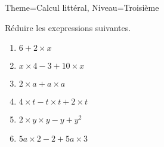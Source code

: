 \documentclass[11pt]{article}
\begin{document}
\begin{multicols}{2}
\begin{Maquette}[Fiche]{Theme=Calcul littéral, Niveau=Troisième}
\columnbreak

\begin{exercice}
    Réduire les exepressions suivantes.
    \begin{enumerate}[label=\textbf{\alph*.}]
        \item $6 + 2 \times x$
        \item $x \times 4 -3 + 10 \times x $
        \item $ 2 \times a + a \times a$
        \item $4 \times t - t \times t + 2 \times t$
        \item $2 \times y \times y - y + y^2$
        \item $5a \times 2 - 2 + 5a \times 3$
    \end{enumerate}
\end{exercice}

\end{Maquette}

\end{multicols}
\end{document}
